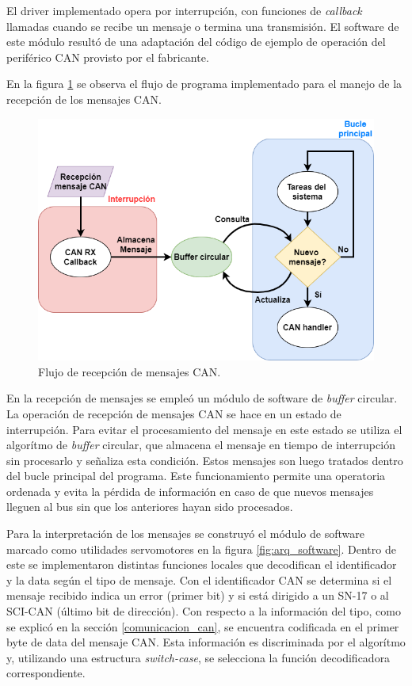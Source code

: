 El driver implementado opera por interrupción, con funciones de \textit{callback} llamadas cuando se recibe un mensaje o termina una transmisión. El software de este módulo resultó de una adaptación del código de ejemplo de operación del periférico CAN provisto por el fabricante.

En la figura \ref{fig:can_handler} se observa el flujo de programa implementado para el manejo de la recepción de los mensajes CAN.

\begin{figure}[htbp]
	\centering
	\includegraphics[scale=.5]{./Figures/Can_handler.png}
	\caption{Flujo de recepción de mensajes CAN.}
	\label{fig:can_handler}
\end{figure}

En la recepción de mensajes se empleó un módulo de software de \textit{buffer} circular\citep{tpf_gabriel}. La operación de recepción de mensajes CAN se hace en un estado de interrupción. Para evitar el procesamiento del mensaje en este estado se utiliza el algorítmo de \textit{buffer} circular, que almacena el mensaje en tiempo de interrupción sin procesarlo y señaliza esta condición. Estos mensajes son luego tratados dentro del bucle principal del programa. Este funcionamiento permite una operatoria ordenada y evita la pérdida de información en caso de que nuevos mensajes lleguen al bus sin que los anteriores hayan sido procesados.

Para la interpretación de los mensajes se construyó el módulo de software marcado como utilidades servomotores en la figura \ref{fig:arq_software}. Dentro de este se implementaron distintas funciones locales que decodifican el identificador y la data según el tipo de mensaje. Con el identificador CAN se determina si el mensaje recibido indica un error (primer bit) y si está dirigido a un SN-17 o al SCI-CAN (último bit de dirección). Con respecto a la información del tipo, como se explicó en la sección \ref{comunicacion_can}, se encuentra codificada en el primer byte de data del mensaje CAN. Esta información es discriminada por el algorítmo y, utilizando una estructura \textit{switch-case}, se selecciona la función decodificadora correspondiente.


